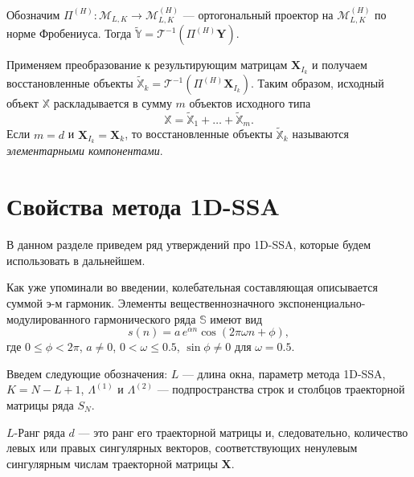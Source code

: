\documentclass[specialist,
               substylefile = spbu.rtx,
               subf,href,colorlinks=true, 12pt]{disser}
\begin{document}
Обозначим $\Pi^{(H)}: \mathcal{M}_{L,K} \rightarrow \mathcal{M}_{L,K}^{(H)}$ --- ортогональный проектор на $\mathcal{M}_{L,K}^{(H)}$ по норме Фробениуса. Тогда $\widetilde{\mathbb{Y}} = \mathcal{T}^{-1}\left( \Pi^{(H)} \mathbf{Y}\right)$.

Применяем преобразование к результирующим матрицам $\mathbf{X}_{I_k}$ и получаем восстановленные объекты $\widetilde{\mathbb{X}}_k =\mathcal{T}^{-1}\left( \Pi^{(H)} \mathbf{X}_{I_k}\right)$. Таким образом, исходный объект $\mathbb{X}$ раскладывается в сумму $m$ объектов исходного типа
\begin{equation*}
\mathbb{X} = \widetilde{\mathbb{X}}_1 + \ldots + \widetilde{\mathbb{X}}_m.
\end{equation*}
Если $m = d$ и $\mathbf{X}_{I_k} = \mathbf{X}_k$, то восстановленные объекты $\widetilde{\mathbb{X}}_k$ называются \textit{элементарными компонентами}.

\section{Свойства метода 1D-SSA}
\label{sec:1d_ssa_theory}
В данном разделе приведем ряд утверждений про 1D-SSA, которые будем использовать в дальнейшем.

Как уже упоминали во введении, колебательная составляющая описывается суммой э-м гармоник. 
Элементы вещественнозначного экспоненциально-модулированного гармонического ряда $\mathbb{S}$ имеют вид
\begin{equation} \label{eq:ex_mod_garm_1d}
 s(n) = a\, e^{\alpha n} \cos(2\pi\omega n + \phi),
\end{equation}
где $0 \leqslant \phi < 2\pi$, $a \not = 0$, $0<\omega \leqslant 0.5$, $\sin \phi \not = 0$ для $\omega = 0.5$.

Введем следующие обозначения: $L$ --- длина окна, параметр метода 1D-SSA, $K=N-L+1$, $\Lambda^{(1)}$ и $\Lambda^{(2)}$ --- подпространства строк и столбцов траекторной матрицы ряда $S_N$.

$L$-Ранг ряда $d$ --- это ранг его траекторной матрицы и, следовательно, количество левых или правых сингулярных векторов, соответствующих ненулевым сингулярным числам траекторной матрицы $\mathbf{X}$.

\end{document}
